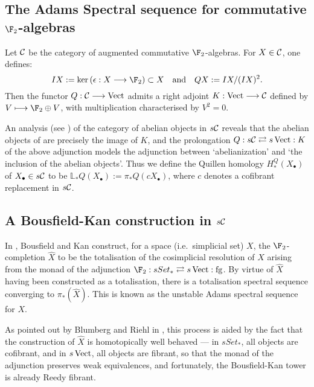 \documentclass[10pt]{article}
\renewcommand{\Set}{Set}
\newcommand{\forgetSymbol}{\mathrm{fg}}
\newcommand{\Comm}{\calC}
\begin{document}
\begin{AdamsDerivation}
\pagebreak
\section{The Adams Spectral sequence for commutative $\F_2$-algebras}
Let $\Comm$ be the category of augmented commutative $\F_2$-algebras. For $X\in \Comm$, one defines:
\[IX:=\ker(\epsilon:X\to\F_2)\subset X\textup{\quad and\quad }QX:=IX/(IX)^2.\]
Then the functor $Q:\Comm\to\Vect$ admits a right adjoint $K:\Vect\to\Comm$ defined by $V\mapsto \F_2\oplus V$, with multiplication characterised by $V^2=0$.

An analysis (see \cite[\S4]{MR1089001}) of the category of abelian objects in $s\Comm$ reveals that the abelian objects of are precisely the image of $K$, and the prolongation $Q:s\Comm\rightleftarrows s\Vect:K$ of the above adjunction models the adjunction between `abelianization' and `the inclusion of the abelian objects'. Thus we define the Quillen homology $H_*^Q(X_{\bullet})$ of $X_{\bullet}\in s\Comm$ to be $\mathbb{L}_*Q(X_{\bullet}):=\pi_*Q(cX_\bullet)$, where $c$ denotes a cofibrant replacement in $s\Comm$.





\subsection{A Bousfield-Kan construction in $s\Comm$}
In \cite{MR0365573}, Bousfield and Kan construct, for a space (i.e.\ simplicial set) $X$, the $\F_2$-completion $\hat X$ to be the totalisation of the cosimplicial resolution of $X$ arising from the monad of the adjunction $\F_2:s\Set_*\rightleftarrows s\Vect:\forgetSymbol$. By virtue of $\hat X$ having been constructed as a totalisation, there is a totalisation spectral sequence converging to $\pi_*(\hat X)$. This is known as the unstable Adams spectral sequence for $X$.

As pointed out by Blumberg and Riehl in \cite{BlumRiehlResolutions.pdf}, this process is aided by the fact that the construction of $\hat X$ is homotopically well behaved --- in $s\Set_*$, all objects are cofibrant, and in $s\operatorname{Vect}$, all objects are fibrant, so that the monad of the adjunction preserves weak equivalences, and fortunately, the Bousfield-Kan tower is already Reedy fibrant.


\end{AdamsDerivation}
\end{document}
